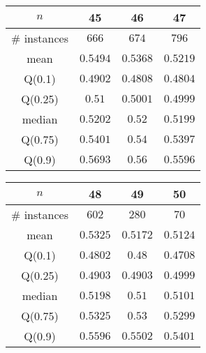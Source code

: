 \begin{tabular}{c|ccc} 
\hline 
$n$ & 45 & 46 & 47 \tabularnewline 
\hline 
\hline 
\# instances & $666$ & $674$ & $796$ \tabularnewline 
mean & $0.5494$ & $0.5368$ & $0.5219$ \tabularnewline 
Q(0.1) & $0.4902$ & $0.4808$ & $0.4804$ \tabularnewline 
Q(0.25) & $0.51$ & $0.5001$ & $0.4999$ \tabularnewline 
median & $0.5202$ & $0.52$ & $0.5199$ \tabularnewline 
Q(0.75) & $0.5401$ & $0.54$ & $0.5397$ \tabularnewline 
Q(0.9) & $0.5693$ & $0.56$ & $0.5596$ \tabularnewline 
\hline 
\end{tabular} 
\medskip{} 

\begin{tabular}{c|ccc} 
\hline 
$n$ & 48 & 49 & 50 \tabularnewline 
\hline 
\hline 
\# instances & $602$ & $280$ & $70$ \tabularnewline 
mean & $0.5325$ & $0.5172$ & $0.5124$ \tabularnewline 
Q(0.1) & $0.4802$ & $0.48$ & $0.4708$ \tabularnewline 
Q(0.25) & $0.4903$ & $0.4903$ & $0.4999$ \tabularnewline 
median & $0.5198$ & $0.51$ & $0.5101$ \tabularnewline 
Q(0.75) & $0.5325$ & $0.53$ & $0.5299$ \tabularnewline 
Q(0.9) & $0.5596$ & $0.5502$ & $0.5401$ \tabularnewline 
\hline 
\end{tabular} 
\medskip{} 

